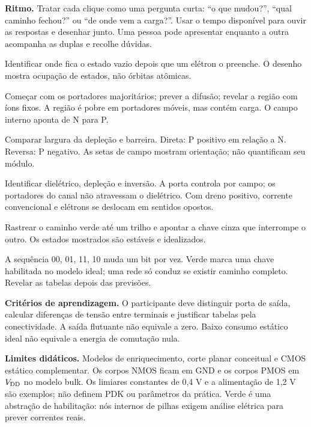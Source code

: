 \documentclass[11pt,a4paper]{article}
\begin{document}
\textbf{Ritmo.} Tratar cada clique como uma pergunta curta: ``o que mudou?'', ``qual caminho fechou?'' ou ``de onde vem a carga?''. Usar o tempo disponível para ouvir as respostas e desenhar junto. Uma pessoa pode apresentar enquanto a outra acompanha as duplas e recolhe dúvidas.
\newpage
{}
\begin{description}[style=nextline]
\item[Deslocamento de lacuna] Identificar onde fica o estado vazio depois que um elétron o preenche. O desenho mostra ocupação de estados, não órbitas atômicas.
\item[Depleção da junção PN] Começar com os portadores majoritários; prever a difusão; revelar a região com íons fixos. A região é pobre em portadores móveis, mas contém carga. O campo interno aponta de N para P.
\item[Polarização da junção] Comparar largura da depleção e barreira. Direta: P positivo em relação a N. Reversa: P negativo. As setas de campo mostram orientação; não quantificam seu módulo.
\item[Ativação do NMOS] Identificar dielétrico, depleção e inversão. A porta controla por campo; os portadores do canal não atravessam o dielétrico. Com dreno positivo, corrente convencional e elétrons se deslocam em sentidos opostos.
\item[Inversor] Rastrear o caminho verde até um trilho e apontar a chave cinza que interrompe o outro. Os estados mostrados são estáveis e idealizados.
\item[NAND/NOR] A sequência 00, 01, 11, 10 muda um bit por vez. Verde marca uma chave habilitada no modelo ideal; uma rede só conduz se existir caminho completo. Revelar as tabelas depois das previsões.
\end{description}
\textbf{Critérios de aprendizagem.} O participante deve distinguir porta de saída, calcular diferenças de tensão entre terminais e justificar tabelas pela conectividade. A saída flutuante não equivale a zero. Baixo consumo estático ideal não equivale a energia de comutação nula.

\textbf{Limites didáticos.} Modelos de enriquecimento, corte planar conceitual e CMOS estático complementar. Os corpos NMOS ficam em GND e os corpos PMOS em $V_{\mathrm{DD}}$ no modelo bulk. Os limiares constantes de 0,4 V e a alimentação de 1,2 V são exemplos; não definem PDK ou parâmetros da prática. Verde é uma abstração de habilitação: nós internos de pilhas exigem análise elétrica para prever correntes reais.
\end{document}
